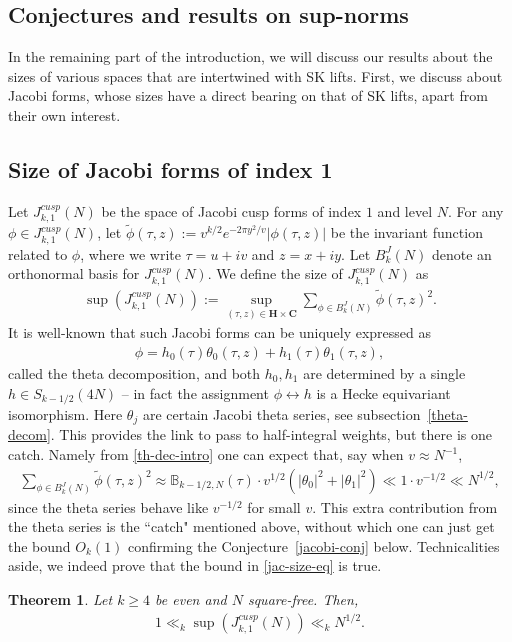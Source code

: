 \documentclass[11pt]{amsart}
\numberwithin{equation}{section}
\theoremstyle{plain}
\newtheorem{thm}{Theorem}[section]
\theoremstyle{definition}
\newcommand{\conjref}[1]{Conjecture~\ref{#1}}
\newcommand{\mbb}{\mathbb}
\newcommand{\mf}{\mathbf}
\newcommand{\jkn}{J^{cusp}_{k,1}(N)}
\begin{document}
\subsection{Conjectures and results on sup-norms}
In the remaining part of the introduction, we will discuss our results about the sizes of various spaces that are intertwined with SK lifts. First, we discuss about Jacobi forms, whose sizes have a direct bearing on that of SK lifts, apart from their own interest.

\subsection{Size of Jacobi forms of index 1} \label{jac-size-intro}
Let $\jkn$ be the space of Jacobi cusp forms of index $1$ and level $N$. For any $\phi\in\jkn$, let $\tilde{\phi}(\tau, z):=v^{k/2}e^{-2\pi y^2/v}|\phi(\tau, z)|$ be the invariant function related to $\phi$, where we write $\tau=u+iv$ and $z=x+iy$. Let $B^J_k(N)$ denote an orthonormal basis for $\jkn$. We define the size of $\jkn$ as
\begin{align}
    \sup(J_{k,1}^{cusp}(N)):=\sup_{(\tau, z)\in \mf H\times \mf C} \sum_{\phi\in B_k^J(N)}  \widetilde \phi (\tau,z)^2.
\end{align}
It is well-known that such Jacobi forms can be uniquely expressed as
\begin{align} \label{th-dec-intro}
    \phi = h_0(\tau) \theta_0(\tau,z) + h_1(\tau) \theta_1(\tau,z),
\end{align}
called the theta decomposition, and both $h_0,h_1$ are determined by a single $h \in S_{k-1/2}(4N)$ -- in fact the assignment $\phi \leftrightarrow h$ is a Hecke equivariant isomorphism. Here $\theta_j$ are certain Jacobi theta series, see subsection~\ref{theta-decom}.
This provides the link to pass to half-integral weights, but there is one catch. Namely from \eqref{th-dec-intro} one can expect that, say when $v\approx N^{-1}$,
\begin{align} \label{jac-size-eq}
   \sum_{\phi\in B_k^J(N)}  \widetilde \phi (\tau,z)^2\approx  \mbb B_{k-1/2,N}(\tau) \cdot v^{1/2} (|\theta_0|^2 + |\theta_1|^2) \ll 1 \cdot v^{-1/2} \ll   N^{1/2},
\end{align}
since the theta series behave like $v^{-1/2}$ for small $v$. This extra contribution from the theta series is the ``catch" mentioned above, without which one can just get the bound $O_k(1)$ confirming the \conjref{jacobi-conj} below.
Technicalities aside, we indeed prove that the bound in \eqref{jac-size-eq} is true. 
\begin{thm} \label{jk1-sup}
Let $k \ge 4$ be even and $N$ square-free. Then,
\begin{align}
   1 \ll_k  \sup( J^{cusp}_{k,1}(N)) \ll_k N^{1/2}.
   \end{align}
\end{thm}
\end{document}
